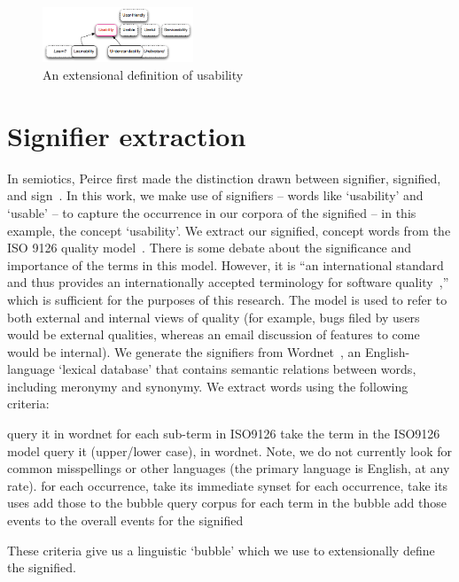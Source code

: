 \documentclass[conference, compsoc]{IEEEtran}
\begin{document}
\begin{figure}[b]
\centering
\includegraphics[width=0.4\textwidth]{synonym-graph.png}
\caption{An extensional definition of usability}
\label{fig:syngraph}
\end{figure}
	
	
\section{Signifier extraction} %
In semiotics, Peirce first made the distinction drawn between signifier, signified, and sign~\cite{atkin2006}. In this work, we make use of signifiers -- words like `usability' and `usable' -- to capture the occurrence in our corpora of the signified -- in this example, the concept `usability'. We extract our signified, concept words from the ISO 9126 quality model~\cite{iso9126}. There is some debate about the significance and importance of the terms in this model. However, it is ``an international standard and thus provides an internationally accepted terminology for software quality~\cite[p. 58]{Boegh2008},'' which is sufficient for the purposes of this research. The model is used to refer to both external and internal views of quality (for example, bugs filed by users would be external qualities, whereas an email discussion of features to come would be internal). We generate the signifiers from Wordnet~\cite{Fellbaum1998}, an English-language `lexical database' that contains semantic relations between words, including meronymy and synonymy. We extract words using the following criteria: 
\begin{algorithmic}
	\STATE query it in wordnet
	\STATE for each sub-term in ISO9126 
	\ENDFOR
take the term in the ISO9126 model
query it (upper/lower case), in wordnet. Note, we do not currently look for common misspellings or other languages (the primary language is English, at any rate).
for each occurrence, take its immediate synset
for each occurrence, take its uses
add those to the bubble
query corpus for each term in the bubble
	add those events to the overall events for the signified

\end{algorithmic}
These criteria give us a linguistic `bubble' which we use to extensionally define the signified.
\end{document}
